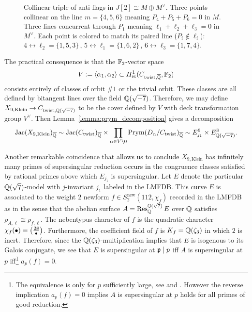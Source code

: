 \documentclass[main.tex]{subfiles}
\begin{document}
\begin{figure}
\caption{Collinear triple of anti-flags in $J[2] \cong M \oplus M^{\vee}$.
    Three points collinear on the line $m = \{4,5,6\}$ meaning $P_4 + P_5 + P_6 = 0$ in $M$. Three lines concurrent through $P_1$ meaning $\ell_1 + \ell_2 + \ell_3 = 0$ in $M^{\vee}$.
    Each point is colored to match its paired line ($P_i \notin \ell_i$):
    \textcolor{lineB}{$4 \leftrightarrow \ell_2 = \{1,5,3\}$}\,,\quad
    \textcolor{lineA}{$5 \leftrightarrow \ell_1 = \{1,6,2\}$}\,,\quad
    \textcolor{lineC}{$6 \leftrightarrow \ell_3 = \{1,7,4\}$}.
    }
\end{figure}

The practical consequence is that the $\mathbb{F}_2$-vector space 
\[ V := \left< \alpha_1, \alpha_2 \right> \subset H^1_{\mathrm{\acute{e}t}}(C_{\mathrm{twist},\overline{\mathbb{Q}}}, \mathbb{F}_2) \]
consists entirely of classes of orbit $\# 1$ or the trivial orbit. These classes are all defined by bitangent lines over the field $\mathbb{Q}(\sqrt{-7})$. Therefore, we may define $X_{9, \mathrm{Klein}} \to C_{\mathrm{twist}, \mathbb{Q}(\sqrt{-7})}$ to be the \etale cover defined by $V$ with deck transformation group $V^{\vee}$. Then Lemma~\ref{lemma:prym_decomposition} gives a decomposition
\[ \operatorname{\mathrm{Jac}}(X_{9, \mathrm{Klein}})_{\overline{\mathbb{Q}}} \sim \operatorname{\mathrm{Jac}}(C_{\mathrm{twist}})_{\overline{\mathbb{Q}}} \times \prod_{\alpha \in V \setminus 0} \operatorname{\mathrm{Prym}}(D_{\alpha}/C_{\mathrm{twist}})_{\overline{\mathbb{Q}}} \sim E_{j_1}^{6} \times E_{\mathbb{Q}(\sqrt{-7})}^3. \]


Another remarkable coincidence that allows us to conclude $X_{9, \mathrm{Klein}}$ has infinitely many primes of supersingular reduction occurs in the congruence classes satisfied by rational primes above which $E_{j_1}$ is supersingular. Let $E$ denote the particular $\mathbb{Q}(\sqrt{7})$-model with $j$-invariant $j_1$ labeled \cite{lmfdb:ecnf-2.2.28.1-16.1-a1} in the LMFDB. This curve $E$ is associated to the weight $2$ newform $f \in S_2^{\mathrm{new}}(112, \chi_f)$ recorded in the LMFDB as \cite{lmfdb:mf-112.2.f.b} in the sense that the abelian surface $A = \operatorname{\mathrm{Res}}^{\mathbb{Q}(\sqrt{7})}_{\mathbb{Q}} E$ over $\mathbb{Q}$ satisfies $\rho_{A,\ell} \cong \rho_{f,\ell}$. The nebentypus character of $f$ is the quadratic character $\chi_f(\bullet) = \left(\frac{28}{\bullet}\right)$.
Furthermore, the coefficient field of $f$ is $K_f = \mathbb{Q}(\zeta_3)$ in which $2$ is inert. Therefore, since the $\mathbb{Q}(\zeta_3)$-multiplication implies that $E$ is isogenous to its Galois conjugate, we see that $E$ is supersingular at $\mathfrak{p} \mid p$ iff $A$ is supersingular at $p$ iff\footnote{The equivalence is only for $p$ sufficiently large, see \cite[Proposition~5.2]{bayer_pilar:hasse-witt_modular_curves} and \cite[Lemma 4]{wang:distribution_supersingular_primes}. However the reverse implication $a_p(f) = 0$ implies $A$ is supersingular at $p$ holds for all primes of good reduction.} $a_p(f) = 0$.
\end{document}
